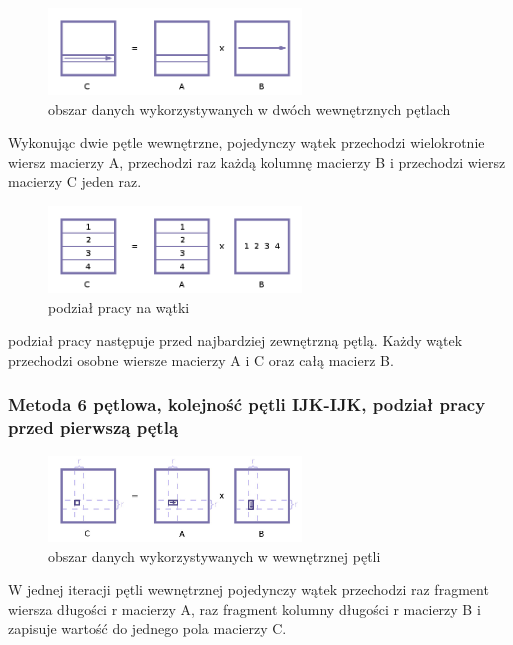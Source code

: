 \documentclass[12pt,a4paper]{article}
\begin{document}
\begin{figure}[H]
  \centering
    \includegraphics[width=0.60\textwidth]{IJK_KJ.jpg}
    \caption{obszar danych wykorzystywanych w dwóch wewnętrznych pętlach}
\end{figure}

Wykonując dwie pętle wewnętrzne, pojedynczy wątek przechodzi wielokrotnie wiersz macierzy A, przechodzi raz każdą kolumnę macierzy B i przechodzi wiersz macierzy C jeden raz.

\begin{figure}[H]
  \centering
    \includegraphics[width=0.60\textwidth]{IJK_KJI.jpg}
    \caption{podział pracy na wątki}
\end{figure}

podział pracy następuje przed najbardziej zewnętrzną pętlą. Każdy wątek przechodzi osobne wiersze macierzy A i C oraz całą macierz B.

\subsubsection{Metoda 6 pętlowa, kolejność pętli IJK-IJK, podział pracy przed pierwszą pętlą}

\begin{figure}[H]
  \centering
    \includegraphics[width=0.60\textwidth]{IJKIJK_KK.jpg}
    \caption{obszar danych wykorzystywanych w wewnętrznej pętli}
\end{figure}

W jednej iteracji pętli wewnętrznej pojedynczy wątek przechodzi raz fragment wiersza długości r macierzy A, raz fragment kolumny długości r macierzy B i zapisuje wartość do jednego pola macierzy C.
\end{document}

